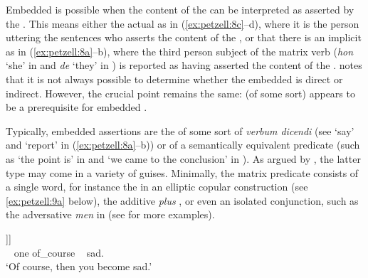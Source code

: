 \documentclass[output=paper,colorlinks,citecolor=brown,draft,draftmode]{langscibook}
\begin{document}
Embedded  is possible when the content of the  can be interpreted as asserted by the  \citep[21]{Andersson1975}. This means either the actual  as in (\ref{ex:petzell:8c}–d), where it is the person uttering the sentences who asserts the content of the , or that there is an implicit  as in (\ref{ex:petzell:8a}–b), where the third person subject of the matrix verb (\textit{hon} ‘she’ in  and \textit{de} ‘they’ in ) is reported as having asserted the content of the . \citet[164–167]{Julien2015} notes that it is not always possible to determine whether the embedded  is direct or indirect. However, the crucial point remains the same:   (of some sort) appears to be a prerequisite for embedded .\largerpage[-2]



Typically, embedded assertions are the  of some sort of \textit{verbum dicendi} (see ‘say’ and ‘report’ in (\ref{ex:petzell:8a}–b)) or of a semantically equivalent predicate (such as ‘the point is’ in  and ‘we came to the conclusion’ in ). As argued by \citet{Julien2009}, the latter type may come in a variety of guises. Minimally, the matrix predicate consists of a single word, for instance the   in an elliptic copular construction (see \ref{ex:petzell:9a} below), the additive  \textit{plus} , or even an isolated conjunction, such as the adversative \textit{men} in  (see \citealt{Lyngfelt2003} for more examples).


\ea\label{ex:petzell:9}
\ea{\label{ex:petzell:9a}
\gll (Det  är)         klart [\textsubscript{CP}  att [\textsubscript{CP}  då      \textit{{blir}}\textsubscript{v}\\
    it        be.\textsc{prs}    clear ~   that ~   then  become.\textsc{prs}      \\}

]]  \\
        ~   one     of\_course ~  sad.\\
\glt `Of course, then you become sad.’  \\
\end{document}
